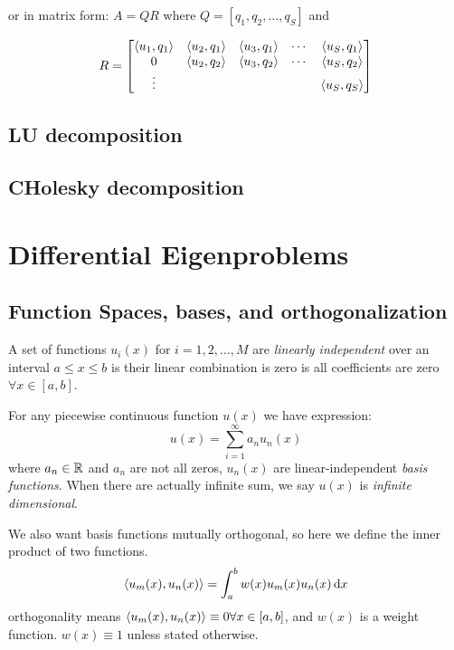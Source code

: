 \documentclass{article}
\begin{document}
or in matrix form: \(A=QR\) where \(Q=[q_1,q_2,\dots,q_S ]\) and 

\[R=\begin{bmatrix}
    \left \langle u_1,q_1 \right \rangle & \left \langle u_2,q_1 \right \rangle & \left \langle u_3,q_1 \right \rangle & \cdots &\left \langle u_S,q_1 \right \rangle\\
    0            & \left \langle u_2,q_2 \right \rangle & \left \langle u_3,q_2 \right \rangle & \cdots &\left \langle u_S,q_2 \right \rangle\\
    \vdots & &&& \left \langle u_S,q_S \right \rangle
\end{bmatrix}\]

\subsection{LU decomposition}

\subsection{CHolesky decomposition}

\section{Differential Eigenproblems}

\subsection{Function Spaces, bases, and orthogonalization}

\begin{definition}
    A set of functions \(u_i(x)\) for \(i=1,2,\dots,M\) are {\it linearly independent} over an interval \(a\leq x\leq b\) is their linear combination is zero is all coefficients are zero \(\forall x\in [a,b]\).
\end{definition}

\begin{remark}
    For any piecewise continuous function \(u(x)\) we have expression:
    \[u(x)=\sum_{i=1}^\infty a_n u_n(x)\] where \(a_n\in\mathbb{R} \) and \(a_n\) are not all zeros, \(u_n(x)\) are linear-independent {\it basis functions}. When there are actually infinite sum, we say \(u(x)\) is {\it infinite dimensional}.
\end{remark}

\begin{definition}
    We also want basis functions mutually orthogonal, so here we define the inner product of two functions.
    \[
        \left \langle u_m(x),u_n(x) \right \rangle=\int_a^b w(x)u_m(x)u_n(x)\,\mathrm{d} x
    \]
    orthogonality means  \(\left \langle u_m(x),u_n(x) \right \rangle\equiv 0\forall x\in [a,b]\), and \(w(x)\) is a weight function. \(w(x)\equiv 1\) unless stated otherwise.
\end{definition}
\end{document}
